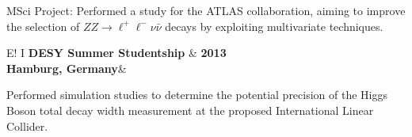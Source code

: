 \documentclass[11pt,a4paper]{article}
\newcommand\VRule{\color{lightgray}\vrule width 0.5pt}
\begin{document}
MSci Project: Performed a study for the ATLAS collaboration, aiming to improve the selection of $ZZ \to \ell^{+}\ell^{-} \nu \bar{\nu}$ decays by exploiting multivariate techniques.\\


\noindent\begin{tabular}{E!{\VRule} I }
{\bf DESY Summer Studentship}   & {\bf 2013}\\
{\bf Hamburg, Germany}&\\
\end{tabular}

Performed simulation studies to determine the potential precision of the Higgs Boson total decay width measurement at the proposed International Linear Collider. \\
\end{document}
